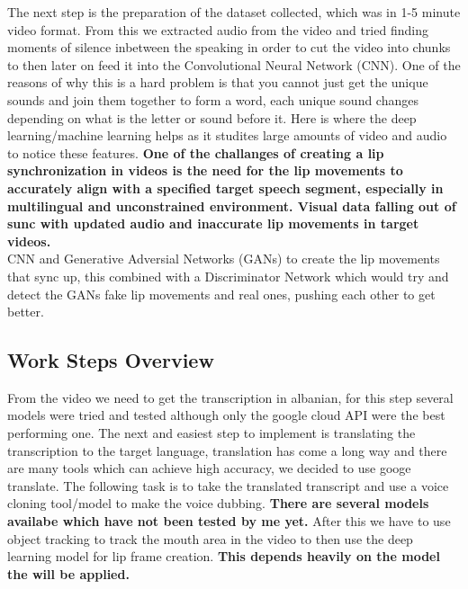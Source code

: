 \documentclass[12pt]{article}
\begin{document}
The next step is the preparation of the dataset collected, which was in 1-5 minute video format. From this we extracted audio from the video and tried finding moments of silence inbetween the speaking in order to cut the video into chunks to then later on feed it into the Convolutional Neural Network (CNN).
One of the reasons of why this is a hard problem is that you cannot just get the unique sounds and join them together to form a word, each unique sound changes depending on what is the letter or sound before it. Here is where the deep learning/machine learning helps as it studites large amounts of video and audio to notice these features.
\textbf{One of the challanges of creating a lip synchronization in videos is the need for the lip movements to accurately align with a specified target speech segment, especially in multilingual and unconstrained environment. Visual data falling out of sunc with updated audio and inaccurate lip movements in target videos.}\\
CNN and Generative Adversial Networks (GANs) to create the lip movements that sync up, this combined with a Discriminator Network which would try and detect the GANs fake lip movements and real ones, pushing each other to get better.

\subsection{Work Steps Overview}

From the video we need to get the transcription in albanian, for this step several models were tried and tested although only the google cloud API were the best performing one. The next and easiest step to implement is translating the transcription to the target language, translation has come a long way and there are many tools which can achieve high accuracy, we decided to use googe translate. The following task is to take the translated transcript and use a voice cloning tool/model to make the voice dubbing. \textbf{There are several models availabe which have not been tested by me yet.} After this we have to use object tracking to track the mouth area in the video to then use the deep learning model for lip frame creation. \textbf{This depends heavily on the model the will be applied.}
\end{document}
